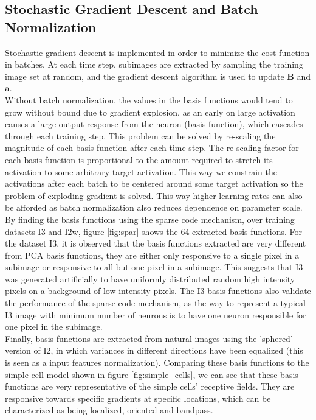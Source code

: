 \documentclass[journal]{IEEEtran}
\begin{document}
\subsection{Stochastic Gradient Descent and Batch Normalization}
Stochastic gradient descent is implemented in order to minimize the cost function in batches. At each time step, subimages are extracted by sampling the training image set at random, and the gradient descent algorithm is used to update $\bm{B}$ and $\bm{a}$.\\ Without batch normalization, the values in the basis functions would tend to grow without bound due to gradient explosion, as an early on large activation causes a large output response from the neuron (basis function), which cascades through each training step. This problem can be solved by re-scaling the magnitude of each basis function after each time step. The re-scaling factor for each basis function is proportional to the amount required to stretch its activation to some arbitrary target activation. This way we constrain the activations after each batch to be centered around some target activation so the problem of exploding gradient is solved. This way higher learning rates can also be afforded as batch normalization also reduces dependence on parameter scale. \\
By finding the basis functions using the sparse code mechanism, over training datasets I3 and I2w, figure \ref{fig:spar} shows the 64 extracted basis functions. For the dataset I3, it is observed that the basis functions extracted are very different from PCA basis functions, they are either only responsive to a single pixel in a subimage or responsive to all but one pixel in a subimage. This suggests that I3 was generated artificially to have uniformly distributed random high intensity pixels on a background of low intensity pixels. The I3 basis functions also validate the performance of the sparse code mechanism, as the way to represent a typical I3 image with minimum number of neurons is to have one neuron responsible for one pixel in the subimage. \\
Finally, basis functions are extracted from natural images using the 'sphered' version of I2, in which variances in different directions have been equalized (this is seen as a input features normalization). Comparing these basis functions to the simple cell model shown in figure \ref{fig:simple_cells}, we can see that these basis functions are very representative of the simple cells' receptive fields. They are responsive towards specific gradients at specific locations, which can be characterized as being localized, oriented and bandpass.
\end{document}
